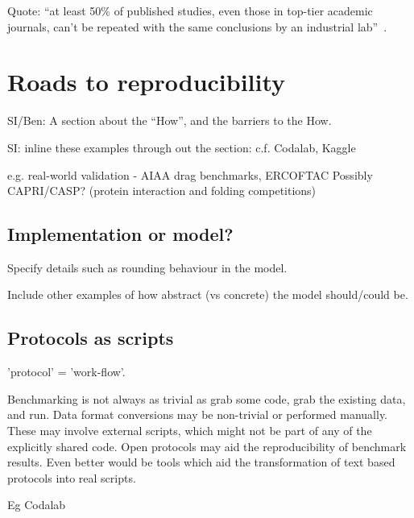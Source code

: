 \documentclass[conference]{IEEEtran}
\begin{document}
Quote: ``at least 50\% of published studies, even those in top-tier
academic journals, can't be repeated with the same conclusions by an
industrial lab''~\cite{osherovich:2011}.



\section{Roads to reproducibility}

SI/Ben: A section about the ``How'', and the barriers to the How. 

SI: inline these examples through out the section: 
	c.f. Codalab, Kaggle

	e.g. real-world validation - AIAA drag benchmarks, ERCOFTAC
	Possibly CAPRI/CASP? (protein interaction and folding competitions)


\subsection{Implementation or model?}

Specify details such as rounding behaviour in the model.

Include other examples of how abstract (vs concrete) the model should/could be. 




\subsection{Protocols as scripts}

'protocol' = 'work-flow'. 

Benchmarking is not always as trivial as grab some code, grab the 
existing data, and run. Data format conversions may be non-trivial
or performed manually. These may involve external scripts, which 
might not be part of any of the explicitly shared code. Open 
protocols may aid the reproducibility of benchmark results. Even 
better would be tools which aid the transformation of text based
protocols into real scripts.

Eg Codalab
\end{document}
